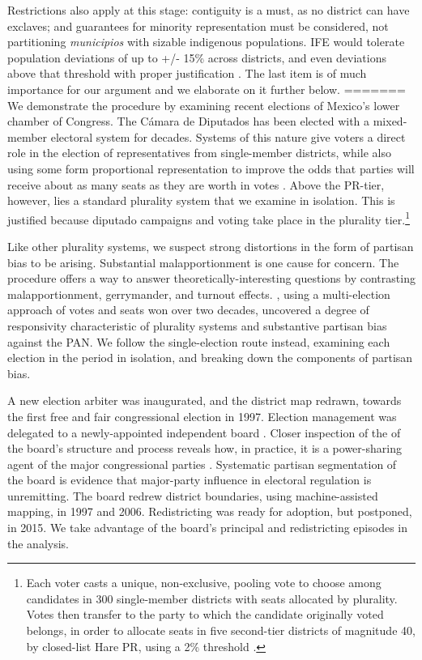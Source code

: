\documentclass[letter,12pt]{article}
\begin{document}
Restrictions also apply at this stage: contiguity is a must, as no district can have exclaves; and guarantees for minority representation must be considered, not partitioning \emph{municipios} with sizable indigenous populations. IFE would tolerate population deviations of up to +/- 15\% across districts, and even deviations above that threshold with proper justification \citep{acuerdo.ife.2004,acuerdo.ife.2013}. The last item is of much importance for our argument and we elaborate on it further below.
=======
We demonstrate the procedure by examining recent elections of Mexico's lower chamber of Congress. The C\'amara de Diputados has been elected with a mixed-member electoral system for decades. Systems of this nature give voters a direct role in the election of representatives from single-member districts, while also using some form proportional representation to improve the odds that parties will receive about as many seats as they are worth in votes \citep{shugart.wattenbergIntro2001}. Above the PR-tier, however, lies a standard plurality system that we examine in isolation. This is justified because diputado campaigns and voting take place in the plurality tier.\footnote{Each voter casts a unique, non-exclusive, pooling vote to choose among candidates in 300 single-member districts with seats allocated by plurality. Votes then transfer to the party to which the candidate originally voted belongs, in order to allocate seats in five second-tier districts of magnitude 40, by closed-list Hare PR, using a 2\% threshold \citep{weldonMixedMemberSys2001}.}

Like other plurality systems, we suspect strong distortions in the form of partisan bias to be arising. Substantial malapportionment is one cause for concern. The procedure offers a way to answer theoretically-interesting questions by contrasting malapportionment, gerrymander, and turnout effects. \citet{marquez2014biasBlog}, using a multi-election approach of votes and seats won over two decades, uncovered a degree of responsivity characteristic of plurality systems and substantive partisan bias against the PAN. We follow the single-election route instead, examining each election in the period in isolation, and breaking down the components of partisan bias. 

A new election arbiter was inaugurated, and the district map redrawn, towards the first free and fair congressional election in 1997. Election management was delegated to a newly-appointed independent board \citep[the Federal Electoral Institute IFE, see][]{lujambio.vives.2008}. Closer inspection of the of the board's structure and process reveals how, in practice, it is a power-sharing agent of the major congressional parties \citep{estevez.magar.rosas.2008}. Systematic partisan segmentation of the board is evidence that major-party influence in electoral regulation is unremitting. The board redrew district boundaries, using machine-assisted mapping, in 1997 and 2006. Redistricting was ready for adoption, but postponed, in 2015. We take advantage of the board's principal and redistricting episodes in the analysis. 
\end{document}
